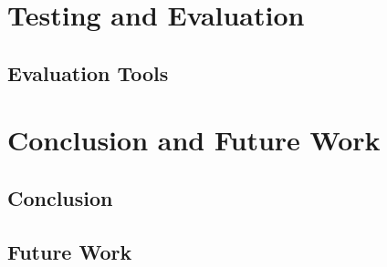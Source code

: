 \documentclass[USenglish]{ifimaster}
\begin{document}
\chapter{Testing and Evaluation}
\section{Evaluation Tools}

\chapter{Conclusion and Future Work}
\section{Conclusion}

\section{Future Work}

\pagebreak
\printbibliography{}
\printglossaries
\end{document}
